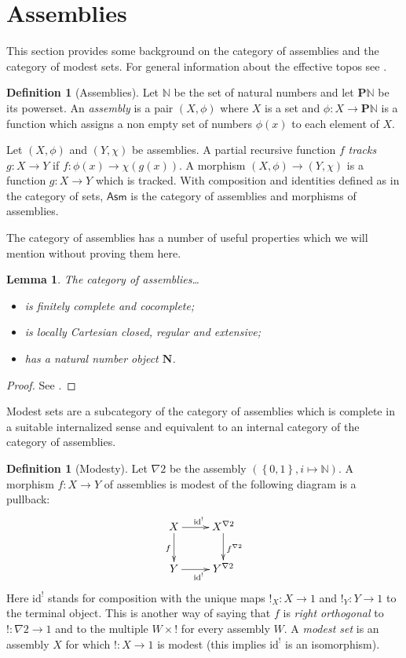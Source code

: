 \documentclass{amsart}
\theoremstyle{plain}
\newtheorem{lemma}[theorem]{Lemma}
\theoremstyle{definition}
\newtheorem{defin}[theorem]{Definition}
\newcommand\set[1]{\left\{#1\right\}}
\newcommand\id{\mathrm{id}}
\newcommand\N{\mathbb N}
\newcommand\pow{\mathbf P}
\newcommand\Asm{\mathsf{Asm}}
\begin{document}
\section{Assemblies}
This section provides some background on the category of assemblies and the category of modest sets. For general information about the effective topos see \cite{MR2479466}.

\begin{defin}[Assemblies] Let $\N$ be the set of natural numbers and let $\pow\N$ be its powerset.
An \emph{assembly} is a pair $(X,\phi)$ where $X$ is a set and $\phi:X\to \pow \N$ is a function which assigns a non empty set of numbers $\phi(x)$ to each element of $X$.

Let $(X,\phi)$ and $(Y,\chi)$ be assemblies. A partial recursive function $f$ \emph{tracks} $g:X\to Y$ if $f: \phi(x) \to \chi(g(x))$. A morphism $(X,\phi)\to (Y,\chi)$ is a function $g:X\to Y$ which is tracked. With composition and identities defined as in the category of sets, $\Asm$ is the category of assemblies and morphisms of assemblies.
\end{defin}

The category of assemblies has a number of useful properties which we will mention without proving them here.

\newcommand\nno{\mathbf N}
\begin{lemma} The category of assemblies\dots
\begin{itemize}
\item is finitely complete and cocomplete;
\item is locally Cartesian closed, regular and extensive;
\item has a natural number object $\nno$.
\end{itemize}

\label{biCartesian closed + nno}
\end{lemma}

\begin{proof} See \cite{MR2479466,MSC:8896618,RealCats}. \end{proof}

Modest sets are a subcategory of the category of assemblies which is complete in a suitable internalized sense and equivalent to an internal category of the category of assemblies.

\newcommand\bang{!}
\begin{defin}[Modesty]
Let $\nabla 2$ be the assembly $(\set{0,1}, i \mapsto \N)$. A morphism $f:X\to Y$ of assemblies is modest of the following diagram is a pullback:
\[\xymatrix{
X \ar[r]^{\id^\bang} \ar[d]_{f} & X^{\nabla 2} \ar[d]^{f^{\nabla 2}}\\
Y \ar[r]_{\id^\bang} & Y^{\nabla 2}
}\]
Here $\id^\bang$ stands for composition with the unique maps $\bang_X:X\to 1$ and $\bang_Y: Y\to 1$ to the terminal object. This is another way of saying that $f$ is \emph{right orthogonal} to $\bang:\nabla 2\to 1$ and to the multiple $W\times \bang$ for every assembly $W$. A \emph{modest set} is an assembly $X$ for which $\bang:X\to 1$ is modest (this implies $\id^\bang$ is an isomorphism).
\end{defin}
\end{document}
